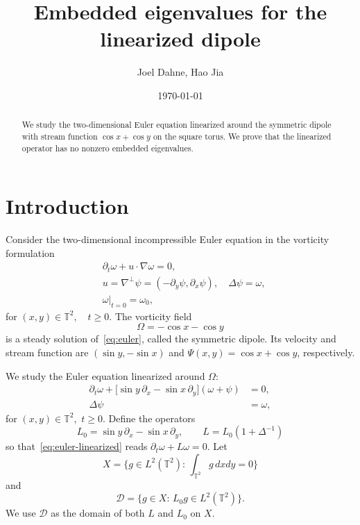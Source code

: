 \documentclass[11pt]{article}
\title{Embedded eigenvalues for the linearized dipole}
\author{Joel Dahne, Hao Jia}
\date{\today}
\numberwithin{equation}{section}
\theoremstyle{definition}
\theoremstyle{remark}
\newcommand{\T}{\mathbb T}
\begin{document}
\maketitle

\begin{abstract}
  We study the two-dimensional Euler equation linearized around the
  symmetric dipole with stream function $\cos x+\cos y$ on the square
  torus. We prove that the linearized operator has no nonzero embedded
  eigenvalues.
\end{abstract}

\tableofcontents

\section{Introduction}

Consider the two-dimensional incompressible Euler equation in the
vorticity formulation
\begin{equation}\label{eq:euler}
    \begin{split}
        &\partial_t\omega+u\cdot\nabla \omega=0,\\
        &u=\nabla^\perp \psi=(-\partial_y\psi,\partial_x\psi),\quad \Delta\psi=\omega,\\
        &\omega|_{t=0}=\omega_0,
    \end{split}
\end{equation}
for $(x,y)\in\T^2,\quad t\ge0$. The vorticity field
\begin{equation*}
\Omega=-\cos x - \cos y
\end{equation*}
is a steady solution of~\eqref{eq:euler}, called the symmetric dipole.
Its velocity and stream function are $(\sin y, -\sin x)$ and
$\Psi(x,y)=\cos x + \cos y$, respectively.

We study the Euler equation linearized around $\Omega$:
\begin{equation}\label{eq:euler-linearized}
    \begin{split}
        \partial_t\omega+\Big[\sin y \,\partial_x - \sin x \,\partial_y\Big](\omega+\psi)&=0,\\
        \Delta\psi &=\omega,
    \end{split}
\end{equation}
for $(x,y)\in\T^2,\, \,t\ge0$. Define the operators
\begin{equation*}
  L_0=\sin y \,\partial_x - \sin x \,\partial_y,\qquad
  L = L_{0}(1+\Delta^{-1})
\end{equation*}
so that~\eqref{eq:euler-linearized} reads
$\partial_t\omega+L\omega=0$. Let
\begin{equation*}
    X = \Big\{g\in L^2(\T^2):\, \int_{\T^2}g\,dxdy=0\Big\}
\end{equation*}
and
\begin{equation*}
    \mathcal{D}=\Big\{g\in X:\, L_0g\in L^2(\T^2)\Big\}.
\end{equation*}
We use $\mathcal D$ as the domain of both $L$ and $L_0$ on $X$.
\end{document}
